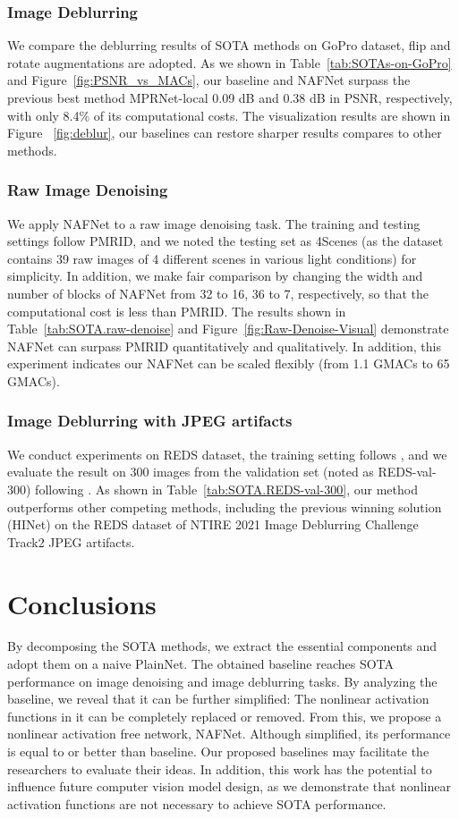\documentclass[runningheads]{llncs}
\begin{document}
\subsubsection{Image Deblurring} We compare the deblurring results of SOTA methods on GoPro\cite{nah2017deep} dataset, flip and rotate augmentations are adopted. As we shown in Table~\ref{tab:SOTAs-on-GoPro} and Figure~\ref{fig:PSNR_vs_MACs}, our baseline and NAFNet surpass the previous best method MPRNet-local\cite{chu2021revisiting} 0.09 dB and 0.38 dB in PSNR, respectively, with only 8.4\% of its computational costs. The visualization results are shown in Figure ~\ref{fig:deblur}, our baselines can restore sharper results compares to other methods. 
\subsubsection{Raw Image Denoising} We apply NAFNet to a raw image denoising task. The training and testing settings follow PMRID\cite{wang2020practical}, and we noted the testing set as 4Scenes (as the dataset contains 39 raw images of 4 different scenes in various light conditions) for simplicity. In addition, we make fair comparison by changing the width and number of blocks of NAFNet from 32 to 16, 36 to 7, respectively, so that the computational cost is less than PMRID. The results shown in Table~\ref{tab:SOTA.raw-denoise} and Figure~\ref{fig:Raw-Denoise-Visual} demonstrate NAFNet can surpass PMRID quantitatively and qualitatively. In addition, this experiment indicates our NAFNet can be scaled flexibly (from 1.1 GMACs to 65 GMACs).
\subsubsection{Image Deblurring with JPEG artifacts} We conduct experiments on REDS\cite{nah2021ntire} dataset, the training setting follows \cite{chen2021hinet,tu2022maxim}, and we evaluate the result on 300 images from the validation set (noted as REDS-val-300) following \cite{chen2021hinet,tu2022maxim}. As shown in Table~\ref{tab:SOTA.REDS-val-300},  our method outperforms other competing methods, including the previous winning solution (HINet) on the REDS dataset of NTIRE 2021 Image Deblurring Challenge Track2 JPEG artifacts\cite{nah2021ntire}. 


\section{Conclusions}
By decomposing the SOTA methods, we extract the essential components and adopt them on a naive PlainNet. The obtained baseline reaches SOTA performance on image denoising and image deblurring tasks. By analyzing the baseline, we reveal that it can be further simplified: The nonlinear activation functions in it can be completely replaced or removed. From this, we propose a nonlinear activation free network, NAFNet. Although simplified, its performance is equal to or better than baseline. Our proposed baselines may facilitate the researchers to evaluate their ideas. In addition, this work has the potential to influence future computer vision model design, as we demonstrate that nonlinear activation functions are not necessary to achieve SOTA performance.
\end{document}
